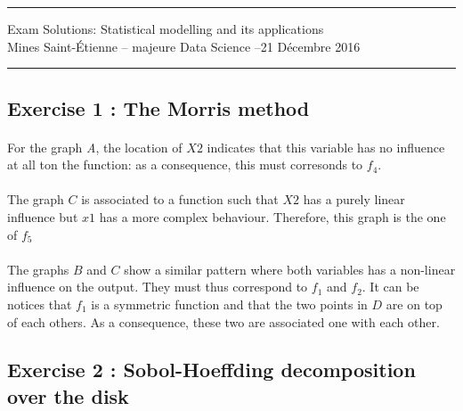 \documentclass[a4paper,10pt]{article}
\begin{document}
\begin{center}
\hrule \vspace{3mm}
	{\Large Exam Solutions: Statistical modelling and its applications}\\ \vspace{3mm}
	{Mines Saint-\'Etienne -- majeure Data Science --21 Décembre 2016} \\ \vspace{3mm}
	\hrule
\end{center}
\vspace{5mm}

\subsection*{Exercise 1 : The Morris method} 

\paragraph{}
For the graph \emph{A}, the location of $X2$ indicates that this variable has no influence at all ton the function: as a consequence, this must corresonds to $f_4$.

\paragraph{}
The graph $C$ is associated to a function such that $X2$ has a purely linear influence but $x1$ has a more complex behaviour. Therefore, this graph is the one of $f_5$

\paragraph{}
The graphs $B$ and $C$ show a similar pattern where both variables has a non-linear influence on the output. They must thus correspond to $f_1$ and $f_2$. It can be notices that $f_1$ is a symmetric function and that the two points in $D$ are on top of each others. As a consequence, these two are associated one with each other.

\subsection*{Exercise 2 : Sobol-Hoeffding decomposition over the disk}
\end{document}
